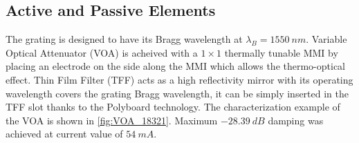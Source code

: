 \subsection{Active and Passive Elements}
The grating is designed to have its Bragg wavelength at $\lambda_B=1550 \ nm$.  Variable Optical Attenuator (VOA) is acheived with a $1\times 1$  thermally tunable MMI by placing an electrode on the side along the MMI which allows the thermo-optical effect. Thin Film Filter (TFF) acts as a high reflectivity mirror with its operating wavelength covers the grating Bragg wavelength, it can be simply inserted in the TFF slot thanks to the Polyboard technology. The characterization example of the VOA is shown in \autoref{fig:VOA_18321}. Maximum $-28.39 \ dB$ damping was achieved at current value of $54 \ mA$. 

